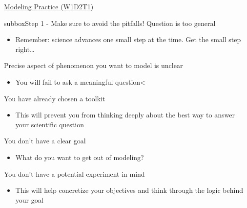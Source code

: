 \begin{textbox}{\href{https://compneuro.neuromatch.io/tutorials/W1D2_ModelingPractice/W1D2_Intro.html}{Modeling Practice  (W1D2T1)} }
\begin{subbox}{subbox}{Step 1 - Make sure to avoid the pitfalls! }
Question is too general
\begin{itemize}
     \item Remember: science advances one small step at the time. Get the small step right…  \end{itemize}
 Precise aspect of phenomenon you want to model is unclear
  \begin{itemize}
     \item You will fail to ask a meaningful question<  \end{itemize}
 You have already chosen a toolkit
 \begin{itemize}
     \item This will prevent you from thinking deeply about the best way to answer your scientific question
   \end{itemize}

 You don’t have a clear goal
 \begin{itemize}
     \item What do you want to get out of modeling? \end{itemize}
 You don’t have a potential experiment in mind
 \begin{itemize}
     \item 
 This will help concretize your objectives and think through the logic behind your goal
 \end{itemize}
 
  \end{subbox}
\end{textbox}
